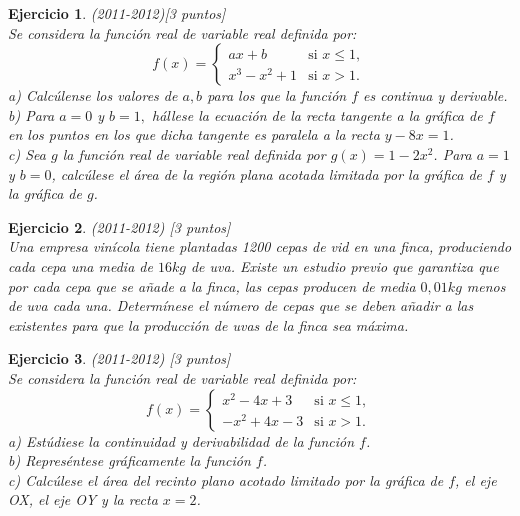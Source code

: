 \documentclass[12pt, a4paper]{amsart}
\newtheorem{ejer}{Ejercicio}
\begin{document}
\begin{ejer}\em (2011-2012)[3 puntos]\\
Se considera la función real de variable real definida por:
\begin{equation*}
f(x)=\left \{ \begin{matrix} ax+b & \mbox{si } x\leq 1,
\\ x^3-x^2+1 & \mbox{si } x > 1. \end{matrix}\right. 
\end{equation*}
a) Calcúlense los valores de $a,b$ para los que la función $f$ es continua y derivable.\\
b) Para $a=0$ y $b=1,$ hállese la ecuación de la recta tangente a la gráfica de $f$ en los puntos en los que dicha tangente es paralela a la recta $y-8x=1$.\\
c) Sea $g$ la función real de variable real definida por $g(x)=1-2x^2$. Para $a=1$ y $b=0$, calcúlese el área de la región plana acotada limitada por la gráfica de $f$ y la gráfica de  $g$.
\end{ejer}

\begin{ejer}\em (2011-2012) [3 puntos]\\
Una empresa vinícola tiene plantadas 1200 cepas de vid en una finca, produciendo cada cepa una media de $16kg$ de uva. Existe un estudio previo que garantiza que por cada cepa que se añade a la finca, las cepas producen de media $0,01kg$ menos de uva cada una. Determínese el número de cepas que se deben añadir a las existentes para que la producción de uvas de la finca sea máxima.
\end{ejer}


\begin{ejer}\em (2011-2012) [3 puntos]\\
Se considera la función real de variable real definida por:
\begin{equation*}
f(x)=\left \{ \begin{matrix} x^2-4x+3 & \mbox{si } x\leq 1,
\\ -x^2+4x-3 & \mbox{si } x > 1. \end{matrix}\right. 
\end{equation*}
a) Estúdiese la continuidad y derivabilidad de la función $f$.\\
b) Represéntese gráficamente la función $f$.\\
c) Calcúlese el área del recinto plano acotado limitado por la gráfica de $f$, el eje OX, el eje OY y la recta $x=2$.
\end{ejer}
\end{document}
